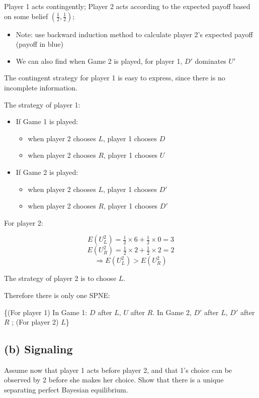 \documentclass{article}
\begin{document}
\begin{mdframed}[backgroundcolor=blue!20,linecolor=white]
Player 1 acts contingently; Player 2 acts according to the expected payoff based on some belief $(\tfrac12,\tfrac12)$; 
\begin{itemize}
\item Note: use backward induction method to calculate player 2's expected payoff (payoff in blue)
\item We can also find when Game 2 is played, for player 1, $D'$ dominates $U'$
\end{itemize}

The contingent strategy for player 1 is easy to express, since there is no incomplete information.

\end{mdframed}

The strategy of player 1:
\begin{itemize}
\item If Game 1 is played:
\begin{itemize}
\item when player 2 chooses $L$, player 1 chooses $D$
\item when player 2 chooses $R$, player 1 chooses $U$
\end{itemize}
\item If Game 2 is played:
\begin{itemize}
\item when player 2 chooses $L$, player 1 chooses $D'$
\item when player 2 chooses $R$, player 1 chooses $D'$
\end{itemize}
\end{itemize}

For player 2:


$$E(U^2_L) = \tfrac12 \times 6 +\tfrac12 \times 0 = 3$$
$$E(U^2_R) = \tfrac12 \times 2 +\tfrac12 \times 2 = 2$$
$$\Rightarrow E(U^2_L) > E(U^2_R)$$

The strategy of player 2 is to choose $L$.

\medskip

Therefore there is only one SPNE:

\{(For player 1) In Game 1: $D$ after $L$, $U$ after $R$. In Game 2, $D'$ after $L$, $D'$ after $R$ ; (For player 2) $L$\}


\subsection*{(b) Signaling} Assume now that player 1 acts before player 2, and that 1's choice can be observed by 2 before she makes her choice. Show that there is a unique separating perfect Bayesian equilibrium.
\end{document}
